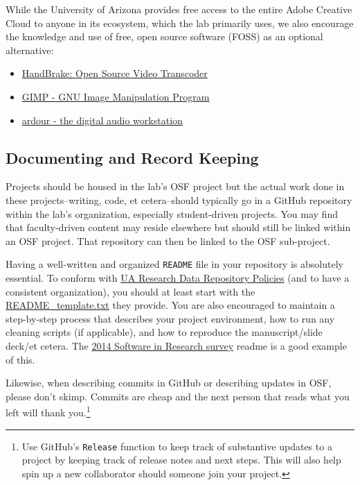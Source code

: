 \documentclass[]{tufte-book}
\providecommand{\tightlist}{%
  \setlength{\itemsep}{0pt}\setlength{\parskip}{0pt}}
\begin{document}
While the University of Arizona provides free access to the entire Adobe Creative Cloud to anyone in its ecosystem, which the lab primarily uses, we also encourage the knowledge and use of free, open source software (FOSS) as an optional alternative:

\begin{itemize}
\tightlist
\item
  \href{https://handbrake.fr/}{HandBrake: Open Source Video Transcoder}
\item
  \href{https://www.gimp.org/}{GIMP - GNU Image Manipulation Program}
\item
  \href{https://ardour.org/}{ardour - the digital audio workstation}
\end{itemize}

\hypertarget{documenting}{%
\subsection{Documenting and Record Keeping}\label{documenting}}

Projects should be housed in the lab's OSF project but the actual work done in these projects--writing, code, et cetera--should typically go in a GitHub repository within the lab's organization, especially student-driven projects. You may find that faculty-driven content may reside elsewhere but should still be linked within an OSF project. That repository can then be linked to the OSF sub-project.

Having a well-written and organized \texttt{README} file in your repository is absolutely essential. To conform with \href{https://data.library.arizona.edu/data-management/best-practices/data-documentation-readme-metadata}{UA Research Data Repository Policies} (and to have a consistent organization), you should at least start with the \href{https://osf.io/sj8xv/}{README\_template.txt} they provide. You are also encouraged to maintain a step-by-step process that describes your project environment, how to run any cleaning scripts (if applicable), and how to reproduce the manuscript/slide deck/et cetera. The \href{https://github.com/softwaresaved/software_in_research_survey_2014/blob/1.0/README.md}{2014 Software in Research survey} readme is a good example of this.

Likewise, when describing commits in GitHub or describing updates in OSF, please don't skimp. Commits are cheap and the next person that reads what you left will thank you.\footnote{Use GitHub's \texttt{Release} function to keep track of substantive updates to a project by keeping track of release notes and next steps. This will also help spin up a new collaborator should someone join your project.}
\end{document}
